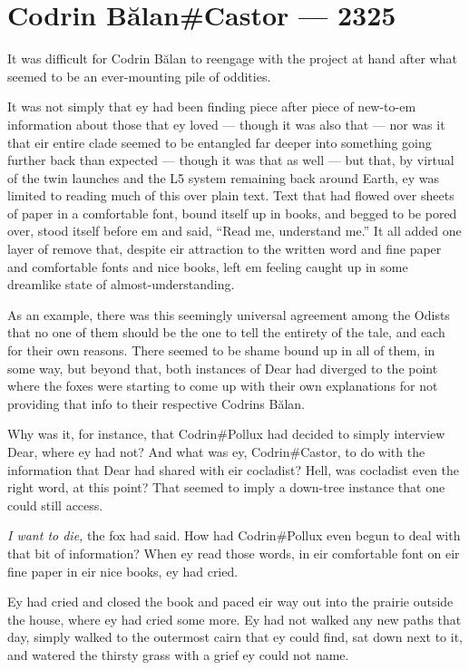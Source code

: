 \hypertarget{codrin-bux103lancastor-2325}{%
\chapter{Codrin Bălan\#Castor — 2325}\label{codrin-bux103lancastor-2325}}

It was difficult for Codrin Bălan to reengage with the project at hand after what seemed to be an ever-mounting pile of oddities.

It was not simply that ey had been finding piece after piece of new-to-em information about those that ey loved — though it was also that — nor was it that eir entire clade seemed to be entangled far deeper into something going further back than expected — though it was that as well — but that, by virtual of the twin launches and the L5 system remaining back around Earth, ey was limited to reading much of this over plain text. Text that had flowed over sheets of paper in a comfortable font, bound itself up in books, and begged to be pored over, stood itself before em and said, ``Read me, understand me.'' It all added one layer of remove that, despite eir attraction to the written word and fine paper and comfortable fonts and nice books, left em feeling caught up in some dreamlike state of almost-understanding.

As an example, there was this seemingly universal agreement among the Odists that no one of them should be the one to tell the entirety of the tale, and each for their own reasons. There seemed to be shame bound up in all of them, in some way, but beyond that, both instances of Dear had diverged to the point where the foxes were starting to come up with their own explanations for not providing that info to their respective Codrins Bălan.

Why was it, for instance, that Codrin\#Pollux had decided to simply interview Dear, where ey had not? And what was ey, Codrin\#Castor, to do with the information that Dear had shared with eir cocladist? Hell, was cocladist even the right word, at this point? That seemed to imply a down-tree instance that one could still access.

\emph{I want to die,} the fox had said. How had Codrin\#Pollux even begun to deal with that bit of information? When ey read those words, in eir comfortable font on eir fine paper in eir nice books, ey had cried.

Ey had cried and closed the book and paced eir way out into the prairie outside the house, where ey had cried some more. Ey had not walked any new paths that day, simply walked to the outermost cairn that ey could find, sat down next to it, and watered the thirsty grass with a grief ey could not name.

